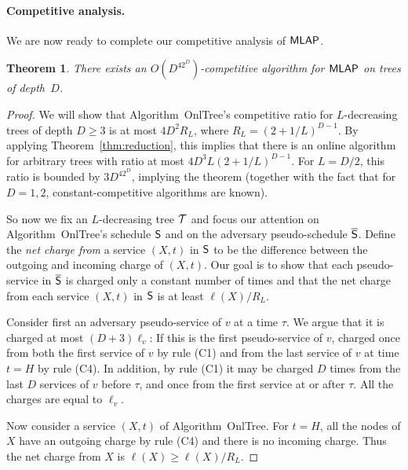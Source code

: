 \documentclass[a4paper]{article}
\newtheorem{theorem}{Theorem}[section]
\newcommand{\calT}{{\cal T}}
\newcommand{\length}{\ell}
\newcommand{\OnAlgTreesGeneral}{{\sc OnlTree}}
\newcommand{\MLAP}{\mbox{\rm\textsf{MLAP}}}
\newcommand{\schedS}{\mbox{\rm\textsf{S}}}
\newcommand{\pseudoschedS}{\overline{\mbox{\rm\textsf{S}}}}
\begin{document}
\paragraph{Competitive analysis.} 

We are now ready to complete our competitive analysis of $\MLAP$.

\begin{theorem}\label{thm: general mlap competitive}
There exists an $O(D^42^D)$-competitive algorithm for $\MLAP$ on 
trees of depth~$D$.
\end{theorem}

\begin{proof}
We will show that Algorithm~{\OnAlgTreesGeneral}'s competitive ratio
for $L$-decreasing trees of depth $D\geq 3$
is at most $4D^2R_L$, where $R_L = (2+1/L)^{D-1}$. 
By applying Theorem~\ref{thm:reduction}, this implies that
there is an online algorithm for arbitrary trees with ratio
at most $4D^3L(2+1/L)^{D-1}$. For $L = D/2$, this
ratio is bounded by $3D^42^D$, implying the theorem (together with the
fact that for $D=1,2$, constant-competitive algorithms are known).

So now we fix an $L$-decreasing tree $\calT$ and focus our attention
on Algorithm~{\OnAlgTreesGeneral}'s schedule $\schedS$ and on the
adversary pseudo-schedule $\pseudoschedS$. Define the \emph{net charge
  from} a service $(X,t)$ in $\schedS$ to be the difference between
the outgoing and incoming charge of $(X,t)$.  Our goal is to show that
each pseudo-service in $\pseudoschedS$ is charged only a constant
number of times and that the net charge from each service $(X,t)$ in
$\schedS$ is at least $\length(X)/R_L$.

Consider first an adversary pseudo-service of $v$ at a time $\tau$. We
argue that it is charged at most $(D+3)\length_v$: If this is the
first pseudo-service of $v$, charged once from both the first service
of $v$ by rule (C1) and from the last service of $v$ at time $t=H$ by
rule (C4). In addition, by rule (C1) it may be charged $D$ times from
the last $D$ services of $v$ before $\tau$, and once from the first
service at or after $\tau$. All the charges are equal to $\length_v$.

Now consider a service $(X,t)$ of Algorithm~{\OnAlgTreesGeneral}. For
$t=H$, all the nodes of $X$ have an outgoing charge by rule (C4)
and there is no incoming charge. Thus the net charge from $X$ is
$\length(X)\geq \length(X)/R_L$.


\end{proof}
\end{document}

